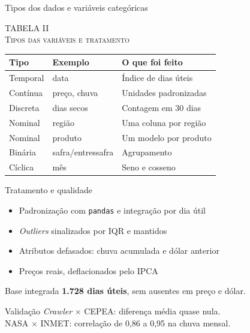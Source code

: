 \documentclass{beamer}
\begin{document}
\begin{frame}{Tipos dos dados e variáveis categóricas}
    \small
    \begin{center}
        {\footnotesize TABELA II\\ \textsc{Tipos das variáveis e tratamento}}\\[0.1cm]
        \begin{tabular}{@{}lll@{}}
            \toprule
            Tipo & Exemplo & O que foi feito \\
            \midrule
            Temporal & data & Índice de dias úteis \\
            Contínua & preço, chuva & Unidades padronizadas \\
            Discreta & dias secos & Contagem em 30 dias \\
            \midrule
            Nominal & região & Uma coluna por região \\
            Nominal & produto & Um modelo por produto \\
            Binária & safra/entressafra & Agrupamento \\
            Cíclica & mês & Seno e cosseno \\
            \bottomrule
        \end{tabular}
    \end{center}
\end{frame}

\begin{frame}{Tratamento e qualidade}
    \begin{itemize}
        \item Padronização com \texttt{pandas} e integração por dia útil
        \item \textit{Outliers} sinalizados por IQR e \alert{mantidos}
        \item Atributos defasados: chuva acumulada e dólar anterior
        \item Preços reais, deflacionados pelo IPCA
    \end{itemize}

    \begin{block}{Base integrada}
        \textbf{1.728 dias úteis}, sem ausentes em preço e dólar.
    \end{block}

    \begin{exampleblock}{Validação}
        \textit{Crawler} $\times$ CEPEA: diferença média quase nula.\\
        NASA $\times$ INMET: correlação de 0,86 a 0,95 na chuva mensal.
    \end{exampleblock}
\end{frame}
\end{document}
